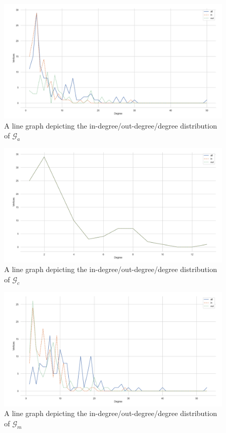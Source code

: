 \documentclass[11pt,a4paper]{book}
\theoremstyle{definition}
\theoremstyle{definition}
\theoremstyle{definition}
\theoremstyle{remark}
\newcommand{\agraph}{\mathcal{G}_{a}}
\newcommand{\cgraph}{\mathcal{G}_{c}}
\newcommand{\acgraph}{\mathcal{G}_{m}}
\begin{document}
\begin{figure}[h]
\includegraphics[width=\textwidth]{agraph_degree_distribution.png}
\caption{A line graph depicting the in-degree/out-degree/degree distribution of $\agraph$}
\label{fig:agraph-degree_distr}
\end{figure}



\begin{figure}[h]
\includegraphics[width=\textwidth]{cgraph_degree_distribution.png}
\caption{A line graph depicting the in-degree/out-degree/degree distribution of $\cgraph$}
\label{fig:cgraph-degree_distr}
\end{figure}


\begin{figure}[h]
\includegraphics[width=\textwidth]{acgraph_degree_distribution.png}
\caption{A line graph depicting the in-degree/out-degree/degree distribution of $\acgraph$}
\label{fig:cgraph-degree_distr}
\end{figure}
\end{document}
